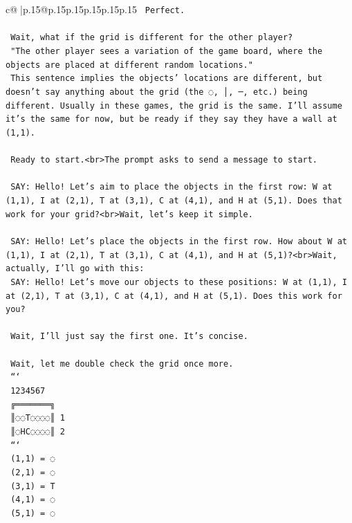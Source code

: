 \documentclass{article}
\begin{document}
{\begin{supertabular}{c@{$\;$}|p{.15\linewidth}@{}p{.15\linewidth}p{.15\linewidth}p{.15\linewidth}p{.15\linewidth}p{.15\linewidth}}
{{{\texttt{    Perfect.} \\
\\ 
\texttt{    Wait, what if the grid is different for the other player?} \\
\texttt{    "The other player sees a variation of the game board, where the objects are placed at different random locations."} \\
\texttt{    This sentence implies the objects' locations are different, but doesn't say anything about the grid (the ◌, │, ─, etc.) being different. Usually in these games, the grid is the same. I'll assume it's the same for now, but be ready if they say they have a wall at (1,1).} \\
\\ 
\texttt{    Ready to start.<br>The prompt asks to send a message to start.} \\
\\ 
\texttt{    SAY: Hello! Let's aim to place the objects in the first row: W at (1,1), I at (2,1), T at (3,1), C at (4,1), and H at (5,1). Does that work for your grid?<br>Wait, let's keep it simple.} \\
\\ 
\texttt{    SAY: Hello! Let's place the objects in the first row. How about W at (1,1), I at (2,1), T at (3,1), C at (4,1), and H at (5,1)?<br>Wait, actually, I'll go with this:} \\
\texttt{    SAY: Hello! Let's move our objects to these positions: W at (1,1), I at (2,1), T at (3,1), C at (4,1), and H at (5,1). Does this work for you?} \\
\\ 
\texttt{    Wait, I'll just say the first one. It's concise.} \\
\\ 
\texttt{    Wait, let me double check the grid once more.} \\
\texttt{    ```} \\
\texttt{     1234567} \\
\texttt{    ╔═══════╗} \\
\texttt{    ║◌◌T◌◌◌◌║ 1} \\
\texttt{    ║◌HC◌◌◌◌║ 2} \\
\texttt{    ```} \\
\texttt{    (1,1) = ◌} \\
\texttt{    (2,1) = ◌} \\
\texttt{    (3,1) = T} \\
\texttt{    (4,1) = ◌} \\
\texttt{    (5,1) = ◌} \\
}}}
\end{supertabular}}
\end{document}
